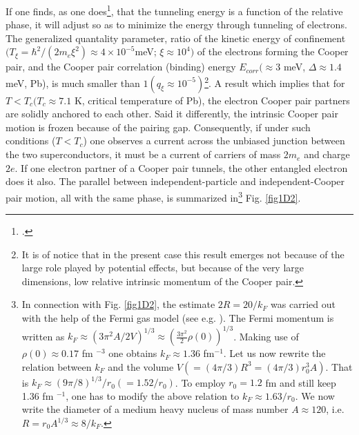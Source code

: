  
 If one finds, as one does\footnote{\cite{Josephson:62,Anderson:63}.}, that the tunneling energy is a function of the relative phase, it will adjust so as to minimize the energy through tunneling of electrons.  The generalized quantality parameter, ratio of the kinetic energy of confinement $(T_\xi=\hbar^2/(2m_e\xi^2)\approx4\times10^{-5}$meV; $\xi\approx10^4)$ of the electrons forming the Cooper pair, and the Cooper pair correlation (binding) energy $E_{corr}(\approx3$ meV, $\Delta\approx1.4$ meV, Pb), is much smaller than $1 (q_\xi\approx10^{-5})$\footnote{It is of notice that in the present case this result emerges not because of the large role played by potential effects, but because of the very large dimensions, low relative intrinsic momentum of the Cooper pair.}. A result which implies that for $T<T_c(T_c\approx7.1$ K, critical temperature of Pb), the electron Cooper pair partners are solidly anchored to each other. Said it differently, the intrinsic Cooper pair motion is frozen because of the pairing gap. Consequently, if under such conditions ($T<T_c$) one observes a current across the unbiased junction between the two superconductors, it must be a current of carriers of mass $2m_e$ and charge $2e$. If one electron partner of a Cooper pair tunnels, the other entangled electron does it also. 
 The parallel between independent-particle and independent-Cooper pair motion, all with the same phase, is summarized in\footnote{In connection with  Fig. \ref{fig1D2}, the estimate $2R=20/k_F$ was carried out with the help of the Fermi gas model (see e.g. \cite{Bohr:69}). The Fermi momentum is written as $k_F\approx (3\pi^2 A/2V)^{1/3}\approx (\frac{3\pi^2}{2}\rho(0))^{1/3}$. Making use of $\rho(0)\approx 0.17$ fm $^{-3}$ one obtains $k_F\approx 1.36 $ fm$^{-1}$. Let us now rewrite the relation between $k_F$ and the volume $V(=(4\pi/3) R^3=(4\pi/3) r_0^3 A)$. That is $k_F\approx (9\pi/8)^{1/3}/r_0(=1.52/r_0)$. To employ $r_0=1.2$ fm and still keep 1.36 fm $^{-1}$, one has to modify the above relation to $k_F\approx 1.63/r_0$. We now write the diameter of a medium heavy nucleus of mass number $A\approx 120$, i.e. $R=r_0A^{1/3}\approx 8/k_F$.} Fig. \ref{fig1D2}.
